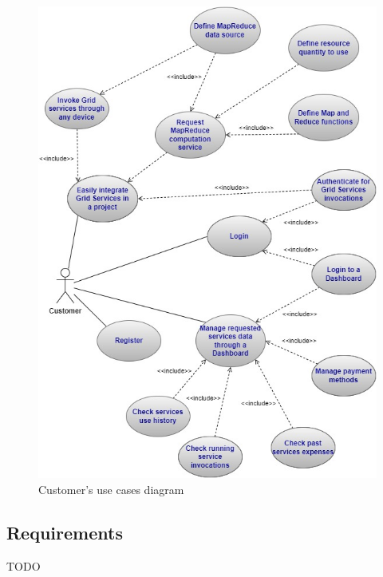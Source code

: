 \begin{figure}[!ht]
    \centering
    \includegraphics[width=\linewidth]{document/chapters/chapter_5/images/customer_use_cases.jpg}
    \caption{Customer's use cases diagram}
    \label{fig:use_cases_customer}
\end{figure}

\subsection{Requirements}
TODO